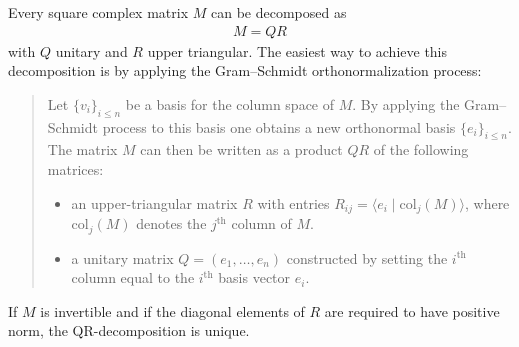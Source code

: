    \begin{method}[QR Decomposition]
        Every square complex matrix $M$ can be decomposed as
        \begin{gather}
            M = QR
        \end{gather}
        with $Q$ unitary and $R$ upper triangular. The easiest way to achieve this decomposition is by applying the Gram--Schmidt orthonormalization process:
        \begin{quote}
            Let $\{v_i\}_{i\leq n}$ be a basis for the column space of $M$. By applying the Gram--Schmidt process to this basis one obtains a new orthonormal basis $\{e_i\}_{i\leq n}$. The matrix $M$ can then be written as a product $QR$ of the following matrices:
            \begin{itemize}
                \item an upper-triangular matrix $R$ with entries $R_{ij} = \langle e_i\mid\mathrm{col}_j(M) \rangle$, where $\mathrm{col}_j(M)$ denotes the $j^{\text{th}}$ column of $M$.
                \item a unitary matrix $Q=(e_1,\ldots,e_n)$ constructed by setting the $i^{\text{th}}$ column equal to the $i^{\text{th}}$ basis vector $e_i$.
            \end{itemize}
        \end{quote}
    \end{method}
    \begin{property}
        If $M$ is invertible and if the diagonal elements of $R$ are required to have positive norm, the QR-decomposition is unique.
    \end{property}

